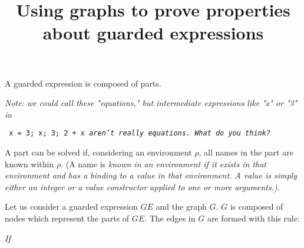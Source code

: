 \documentclass{article}
\title{Using graphs to prove properties about guarded expressions}
\begin{document}
\maketitle

A guarded expression is composed of parts. 

\bigskip

\it{Note: we could call these "equations," but intermediate expressions like 
"x" or "3" in} 

\tt{ x = 3; x; 3; 2 + x}
\it{aren't really equations. What do you think?}

\bigskip

A part can be solved if, considering an environment $\rho$, 
all names in the part are known within $\rho$. (A name is 
\it{known} in an environment if it exists in that environment 
and has a binding to a value in that environment. A \it{value} 
is simply either an integer or a value constructor applied 
to one or more arguments.). 

\bigskip

Let us consider a guarded expression $GE$ and the graph $G$. $G$ is 
composed of nodes which represent the parts of $GE$. The edges in $G$
are formed with this rule:

\it{If }
\end{document}
